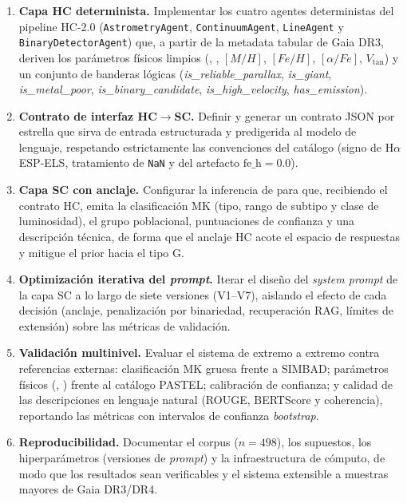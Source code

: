 \begin{enumerate}
  \item \textbf{Capa HC determinista.} Implementar los cuatro agentes
  deterministas del pipeline HC-2.0 (\texttt{AstrometryAgent},
  \texttt{ContinuumAgent}, \texttt{LineAgent} y \texttt{BinaryDetectorAgent})
  que, a partir de la metadata tabular de Gaia DR3, deriven los parámetros
  físicos limpios (\MG{}, \teff{}, $[M/H]$, $[Fe/H]$, $[\alpha/Fe]$,
  $V_\mathrm{tan}$) y un conjunto de banderas lógicas
  (\emph{is\_reliable\_parallax}, \emph{is\_giant}, \emph{is\_metal\_poor},
  \emph{is\_binary\_candidate}, \emph{is\_high\_velocity},
  \emph{has\_emission}).

  \item \textbf{Contrato de interfaz HC$\rightarrow$SC.} Definir y generar un
  contrato JSON por estrella que sirva de entrada estructurada y predigerida al
  modelo de lenguaje, respetando estrictamente las convenciones del catálogo
  (signo de H$\alpha$ ESP-ELS, tratamiento de \texttt{NaN} y del artefacto
  $\mathrm{fe\_h}=0.0$).

  \item \textbf{Capa SC con anclaje.} Configurar la inferencia de \AstroSage{}
  para que, recibiendo el contrato HC, emita la clasificación MK (tipo, rango de
  subtipo y clase de luminosidad), el grupo poblacional, puntuaciones de
  confianza y una descripción técnica, de forma que el anclaje HC acote el
  espacio de respuestas y mitigue el prior hacia el tipo G.

  \item \textbf{Optimización iterativa del \emph{prompt}.} Iterar el diseño del
  \emph{system prompt} de la capa SC a lo largo de siete versiones (V1--V7),
  aislando el efecto de cada decisión (anclaje, penalización por binariedad,
  recuperación RAG, límites de extensión) sobre las métricas de validación.

  \item \textbf{Validación multinivel.} Evaluar el sistema de extremo a extremo
  contra referencias externas: clasificación MK gruesa frente a SIMBAD;
  parámetros físicos (\teff{}, \logg{}) frente al catálogo PASTEL; calibración
  de confianza; y calidad de las descripciones en lenguaje natural (ROUGE,
  BERTScore y coherencia), reportando las métricas con intervalos de confianza
  \emph{bootstrap}.

  \item \textbf{Reproducibilidad.} Documentar el corpus ($n=498$), los supuestos,
  los hiperparámetros (versiones de \emph{prompt}) y la infraestructura de
  cómputo, de modo que los resultados sean verificables y el sistema extensible
  a muestras mayores de Gaia DR3/DR4.
\end{enumerate}

